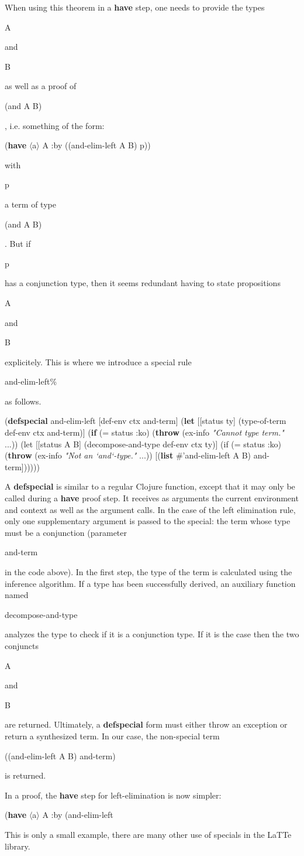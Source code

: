 \documentclass{styles/sig-alternate-05-2015}
\newcommand{\kw}[1]{\textbf{#1}}
\newcommand{\cmt}[1]{\textit{#1}}
\newcommand{\code}[1]{\begin{sffamily}{\small #1}\end{sffamily}}
\begin{document}
When using this theorem in a \kw{have} step, one needs to provide
the types \code{A} and \code{B} as well as a proof of \code{(and A B)},
i.e. something of the form:

\begin{program}
(\kw{have} $\langle$a$\rangle$ A :by ((and-elim-left A B) p))
\end{program}

with \code{p} a term of type \code{(and A B)}. But if \code{p} has a conjunction
type, then it seems redundant having to state propositions \code{A} and \code{B} explicitely.
This is where we introduce a special rule \code{and-elim-left\%} as follows. 

\begin{program}
(\kw{defspecial} and-elim-left%
  [def-env ctx and-term]
  (\kw{let} [[status ty]
             (type-of-term def-env ctx and-term)]
    (\kw{if} (= status :ko)
      (\kw{throw} (ex-info \cmt{"Cannot type term."} ...))
      (let [[status A B]
            (decompose-and-type def-env ctx ty)]
         (if (= status :ko)
           (\kw{throw} (ex-info \cmt{"Not an `and`-type."} ...))
           [(\kw{list} #'and-elim-left A B) and-term])))))
\end{program}

A \kw{defspecial} is similar to a regular Clojure function, except that it may
only be called during a \kw{have} proof step. It receives as arguments the
current environment and context as well as the argument calls. In the case of the
left elimination rule, only one supplementary argument is passed to the special: the
term whose type must be a conjunction (parameter \code{and-term} in the code above).
In the first step, the type of the term is calculated using the inference algorithm.
If a type has been successfully derived, an auxiliary function named
\code{decompose-and-type} analyzes the type to check if it is a conjunction type.
If it is the case then the two conjuncts \code{A} and \code{B} are returned. Ultimately,
a \kw{defspecial} form must either throw an exception or return a synthesized term.
In our case, the non-special term \code{((and-elim-left A B) and-term)} is returned.

In a proof, the \kw{have} step for left-elimination is now simpler:

\begin{program}
(\kw{have} $\langle$a$\rangle$ A :by (and-elim-left%
\end{program}

This is only a small example, there are many other use of specials in the LaTTe library.
\end{document}
